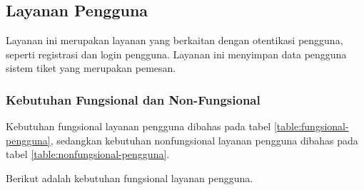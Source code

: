 \subsection{Layanan Pengguna}

Layanan ini merupakan layanan yang berkaitan dengan otentikasi pengguna, seperti registrasi dan login pengguna. Layanan ini menyimpan data pengguna sistem tiket yang merupakan pemesan.

\subsubsection{Kebutuhan Fungsional dan Non-Fungsional}

Kebutuhan fungsional layanan pengguna dibahas pada tabel \ref{table:fungsional-pengguna}, sedangkan kebutuhan nonfungsional layanan pengguna dibahas pada tabel \ref{table:nonfungsional-pengguna}. 

\pagebreak

Berikut adalah kebutuhan fungsional layanan pengguna.

